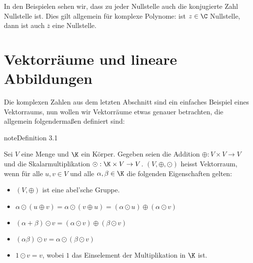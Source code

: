 \documentclass[letterpaper,10pt,english]{jupyterBook}
\begin{document}
In den Beispielen sehen wir, dass zu jeder Nullstelle auch die konjugierte Zahl Nullstelle ist. Dies gilt allgemein für komplexe Polynome: ist \(z \in \C\) Nullstelle, dann ist auch \(\overline{z}\) eine Nullstelle.


\chapter{Vektorräume und lineare Abbildungen}
\label{\detokenize{vektorraeume/vektorraeume:vektorraume-und-lineare-abbildungen}}\label{\detokenize{vektorraeume/vektorraeume::doc}}
Die komplexen Zahlen aus dem letzten Abschnitt sind ein einfaches Beispiel eines Vektorraums, nun wollen wir Vektorräume etwas genauer betrachten, die allgemein folgendermaßen definiert sind:
\label{vektorraeume/vektorraeume:definition-0}
\begin{sphinxadmonition}{note}{Definition 3.1}



Sei \(V\) eine Menge und \(\K\) ein Körper. Gegeben seien die Addition \(\oplus: V \times V \rightarrow V\) und die Skalarmultiplikation \(\odot: \K \times V \rightarrow V\). \((V,\oplus,\odot)\) heisst Vektorraum, wenn für alle \(u,v \in V\) und alle \(\alpha, \beta \in \K\) die folgenden Eigenschaften gelten:
\begin{itemize}
\item {} 
\((V,\oplus)\) ist eine abel’sche Gruppe.

\item {} 
\(\alpha \odot (u \oplus v) = \alpha \odot(v \oplus u) = (\alpha \odot u) \oplus (\alpha \odot v)\)

\item {} 
\((\alpha + \beta) \odot v = (\alpha \odot v) \oplus (\beta \odot v)\)

\item {} 
\((\alpha \beta)\odot v = \alpha \odot (\beta \odot v)\)

\item {} 
\(1 \odot v = v\), wobei \(1\) das Einselement der Multiplikation in \(\K\) ist.

\end{itemize}
\end{sphinxadmonition}
\end{document}
